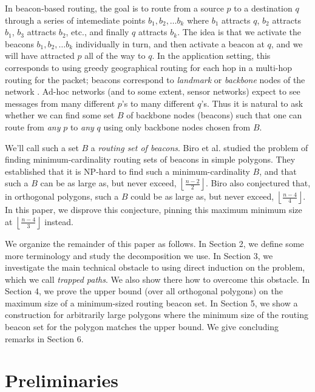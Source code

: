 \documentclass{article}
\newcommand{\floor}[2]{\ensuremath{\left \lfloor {\frac{#1}{#2}} \right
\rfloor}}
\begin{document}
	In beacon-based routing, the goal is to route from a source $p$ to a
	destination $q$ through a series of intemediate points $b_1, b_2, \ldots b_k$
	where $b_1$ attracts $q$, $b_2$ attracts $b_1$, $b_3$ attracts $b_2$, etc., and
	finally $q$ attracts $b_k$.  The idea is that we activate the beacons 
	$b_1, b_2, \ldots b_k$ individually in turn, and then activate a beacon at $q$, 
	and we will have attracted $p$ all of the way to $q$.
	In the application setting, this corresponds to using greedy geographical
	routing for each hop in a multi-hop routing for the packet; beacons correspond
	to \emph{landmark} or \emph{backbone} nodes of the network \cite{4215665}.
	Ad-hoc networks (and to some extent, sensor networks) expect to see messages
	from many different $p$'s to many different $q$'s.
	Thus it is natural to ask whether we can find some set $B$ of backbone nodes
	(beacons) such that one can route from \emph{any} $p$ to \emph{any} $q$ using
	only backbone nodes chosen from $B$. 
	
	We'll call such a set $B$ a \emph{routing set of beacons}.
	Biro et al.\cite{BiroGaoIwerks} studied the
	problem of finding minimum-cardinality routing sets of beacons
	in simple polygons.
	They established that it is NP-hard to find such a minimum-cardinality $B$, and
	that such a $B$ can be as large as, but never exceed, $\floor{n-2}{2}$.
	Biro also conjectured \cite{biro2013beacon} that, in orthogonal polygons,
	such a $B$ could be as large as, but never exceed, \floor{n-4}{4}.
	In this paper, we disprove this conjecture, pinning this maximum
	minimum size at \floor{n-4}{3} instead.
	

 	We organize the remainder of this paper as follows.
 	In Section 2, we define some more terminology and study the decomposition we use.
 	In Section 3, we investigate
 	    the main technical obstacle to using direct induction on the problem,
 	    which we call \emph{trapped paths}.  We also show there how to overcome
 	    this obstacle.
 	In Section 4, we prove the upper bound (over all orthogonal polygons)
 	    on the maximum size of a minimum-sized routing beacon set.
 	In Section 5, we show a construction for arbitrarily large polygons where the
 	minimum size of the routing beacon set for the polygon matches the upper
 	bound.
 	We give concluding remarks in Section 6.
 	
 	
\section{Preliminaries}		
\end{document}
